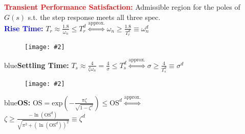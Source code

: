 \documentclass[5pt]{extarticle} %
\newcommand{\customFigure}[3][]{%
    \vspace{-1.5em}
    \begin{figure}[H]
        \centering
        \texttt{[image: \#2]}
    \end{figure}
    \vspace{-1.5em}
}
\begin{document}
\begin{paracol}{3}
{    \textcolor{red}{\textbf{Transient Performance Satisfaction:}} Admissible region for the poles of $G(s)$ s.t. the step response meets all three spec. \\
    \textcolor{blue}{\textbf{Rise Time:}} $T_r \approx \frac{1.8}{\omega_n} \leq T_r^d \overset{\text{approx.}}{\iff} \omega_n \geq \frac{1.8}{T_r^d} \equiv \omega_n^d$ 

    \customFigure[0.1]{../Images/L12_0.png}

    \textcolor{blue}{\textbf{Settling Time:}} $T_s \approx \frac{4}{\zeta \omega_n} = \frac{4}{\sigma} \leq T_s^d \overset{\text{approx.}}{\iff} \sigma \geq \frac{4}{T_s^d} \equiv \sigma^d$ 
    \customFigure[0.1]{../Images/L12_1.png}

    \textcolor{blue}{\textbf{OS:}} $\text{OS} = \text{exp}\left(-\frac{\pi \zeta}{\sqrt{1-\zeta^2}}\right) \leq \text{OS}^d \overset{\text{approx.}}{\iff}$\\ 
    $\zeta \geq \frac{-\ln(\text{OS}^d)}{\sqrt{\pi^2 + (\ln(\text{OS}^d))^2}} \equiv \zeta^d$ 


        }
\end{paracol}
\end{document}

